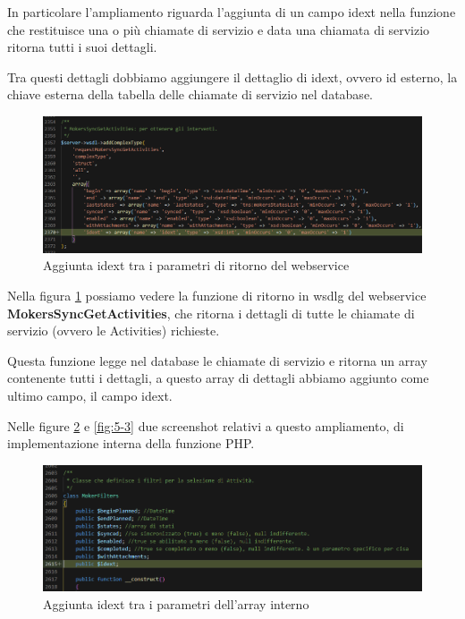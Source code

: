 \newspace

	In particolare l'ampliamento riguarda l'aggiunta di un campo idext nella funzione che restituisce una o più chiamate di servizio e data una chiamata di servizio ritorna tutti i suoi dettagli.
	
	Tra questi dettagli dobbiamo aggiungere il dettaglio di idext, ovvero id esterno, la chiave esterna della tabella delle chiamate di servizio nel database.

\newspace
\begin{figure}[!h] 
	\centering
	\includegraphics[scale = 0.4]{immagini/webservices/ampliamenti/1ampl_types_changefunction} 
	\caption{Aggiunta idext tra i parametri di ritorno del webservice}
	\label{fig:5-1}
\end{figure}
\newspace

	Nella figura \ref{fig:5-1} possiamo vedere la funzione di ritorno in \gls{wsdlg} del webservice \textbf{MokersSyncGetActivities}, che ritorna i dettagli di tutte le chiamate di servizio (ovvero le Activities) richieste. 
	
	Questa funzione legge nel database le chiamate di servizio e ritorna un array contenente tutti i dettagli, a questo array di dettagli abbiamo aggiunto come ultimo campo, il campo idext.


\newpage


	Nelle figure \ref{fig:5-2} e \ref{fig:5-3} due screenshot relativi a questo ampliamento, di implementazione interna della funzione PHP.

\begin{figure}[!h] 
	\centering
	\includegraphics[scale = 0.5]{immagini/webservices/ampliamenti/1ampl_utils_filters.png}
	\caption{Aggiunta idext tra i parametri dell'array interno}
	\label{fig:5-2}
\end{figure}

